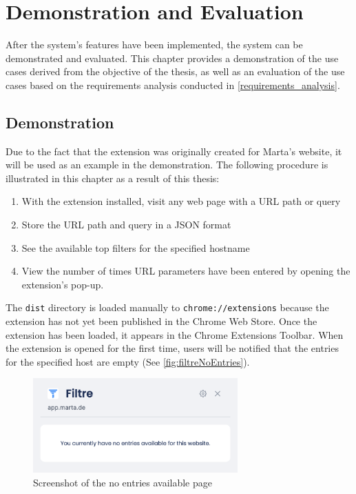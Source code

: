 \newpage
\chapter{Demonstration and Evaluation}
After the system's features have been implemented, the system can be demonstrated and evaluated. This chapter provides a demonstration of the use cases derived from the objective of the thesis, as well as an evaluation of the use cases based on the requirements analysis conducted in \autoref{requirements_analysis}.

\section{Demonstration}
Due to the fact that the extension was originally created for Marta's website, it will be used as an example in the demonstration. The following procedure is illustrated in this chapter as a result of this thesis:

\begin{enumerate}
  \item With the extension installed, visit any web page with a URL path or query
  \item Store the URL path and query in a JSON format
  \item See the available top filters for the specified hostname
  \item View the number of times URL parameters have been entered by opening the extension's pop-up.
\end{enumerate}

The \texttt{dist} directory is loaded manually to \verb;chrome://extensions; because the extension has not yet been published in the Chrome Web Store. Once the extension has been loaded, it appears in the Chrome Extensions Toolbar. When the extension is opened for the first time, users will be notified that the entries for the specified host are empty (See \autoref{fig:filtreNoEntries}).

\begin{figure}[H]
  \centering
  \includegraphics[width=0.7\textwidth]{assets/screenshot_filtre_no_entries.png}
  \caption{Screenshot of the no entries available page}
  \label{fig:filtreNoEntries}
\end{figure}

